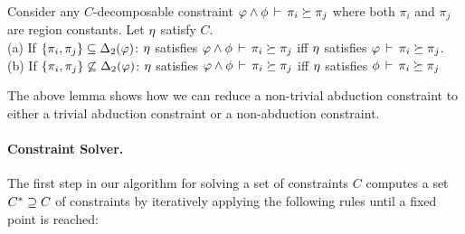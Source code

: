 \begin{lemma}
  \label{lemma:decomposition}
Consider any $C$-decomposable constraint $\varphi \wedge \phi\,\vdash\,\pi_i \succeq \pi_j$
where both $\pi_i$ and $\pi_j$ are region constants.
Let $\eta$ satisfy $C$.\\
(a) If $\{ \pi_i, \pi_j \} \subseteq {\Delta_2}(\varphi)$:
$\eta$ satisfies $\varphi \wedge \phi\,\vdash\,\pi_i \succeq \pi_j$
iff
$\eta$ satisfies $\varphi\,\vdash\,\pi_i \succeq \pi_j$.\\
(b) If $\{ \pi_i, \pi_j \} \not \subseteq {\Delta_2}(\varphi)$:
$\eta$ satisfies $\varphi \wedge \phi\,\vdash\,\pi_i \succeq \pi_j$
iff
$\eta$ satisfies $\phi\,\vdash\,\pi_i \succeq \pi_j$
\end{lemma}

The above lemma shows how we can reduce a non-trivial abduction constraint to
either a trivial abduction constraint or a non-abduction constraint.

\paragraph{Constraint Solver.}
The first step in our algorithm for solving a set of constraints $C$
computes a set ${C}^* \supseteq C$ of constraints by iteratively applying
the following rules until a fixed point is reached:

